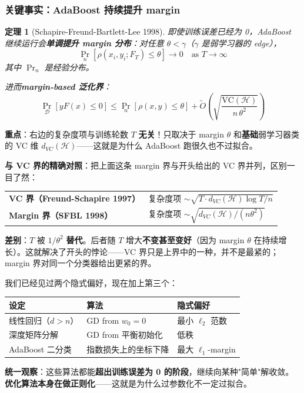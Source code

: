 \documentclass[12pt, a4paper]{ctexart}
\newtheorem{theorem}{定理}[section]
\begin{document}
\subsubsection{关键事实：AdaBoost 持续提升 margin}

\begin{theorem}[Schapire-Freund-Bartlett-Lee 1998]
即使训练误差已经为 0，AdaBoost 继续运行会\textbf{单调提升 margin 分布}：对任意 $\theta < \gamma$（$\gamma$ 是弱学习器的 edge），
\[
\Pr_n[\rho(x_i, y_i; F_T) \leq \theta] \to 0 \quad \text{as } T \to \infty
\]
其中 $\Pr_n$ 是经验分布。

进而\textbf{margin-based 泛化界}：
\[
\Pr_{\mathcal{D}}[y F(x) \leq 0] \leq \Pr_n[\rho(x, y) \leq \theta] + \tilde{O}\!\left(\sqrt{\frac{\mathrm{VC}(\mathcal{H})}{n\,\theta^2}}\right)
\]
\end{theorem}

\textbf{重点}：右边的复杂度项与训练轮数 $T$ \textbf{无关}！只取决于 margin $\theta$ 和\textbf{基础}弱学习器类的 VC 维 $d_{VC}(\mathcal{H})$——这就是为什么 AdaBoost 跑很久也不过拟合。

\textbf{与 VC 界的精确对照}：把上面这条 margin 界与开头给出的 VC 界并列，区别一目了然：

\begin{center}
\renewcommand{\arraystretch}{1.6}
\begin{tabular}{ll}
\toprule
\textbf{VC 界（Freund-Schapire 1997）} & 复杂度项 $\sim \sqrt{T \cdot d_{VC}(\mathcal{H}) \log T / n}$ \\
\textbf{Margin 界（SFBL 1998）} & 复杂度项 $\sim \sqrt{d_{VC}(\mathcal{H}) / (n \theta^2)}$ \\
\bottomrule
\end{tabular}
\end{center}

\textbf{差别}：$T$ 被 $1/\theta^2$ \textbf{替代}。后者随 $T$ 增大\textbf{不变甚至变好}（因为 margin $\theta$ 在持续增长）。这就解决了开头的悖论——VC 界只是上界中的一种，并不是最紧的；margin 界对同一个分类器给出更紧的界。

\begin{keypoint}[第三个隐式偏好]
我们已经见过两个隐式偏好，现在加上第三个：

\begin{center}
\renewcommand{\arraystretch}{1.4}
\begin{tabular}{lll}
\toprule
\textbf{设定} & \textbf{算法} & \textbf{隐式偏好} \\ \midrule
线性回归（$d > n$）& GD from $w_0=0$ & 最小 $\ell_2$ 范数 \\
深度矩阵分解 & GD from 平衡初始化 & 低秩 \\
AdaBoost 二分类 & 指数损失上的坐标下降 & 最大 $\ell_1$-margin \\
\bottomrule
\end{tabular}
\end{center}

\textbf{统一观察}：这些算法都能\textbf{超出训练误差为 0 的阶段}，继续向某种"简单"解收敛。\textbf{优化算法本身在做正则化}——这就是为什么过参数化不一定过拟合。
\end{keypoint}
\end{document}
